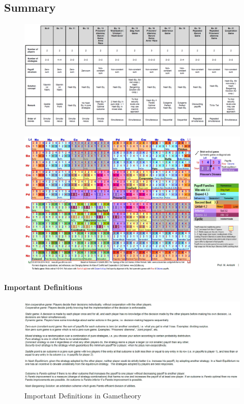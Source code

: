 \subsection{Summary}

\begin{figure}[H]
    \centering
    \includegraphics[width=\textwidth]{Pictures/Game_Theory_summary.png}
\end{figure}

\begin{figure}[H]
    \centering
    \includegraphics[width=\textwidth]{Pictures/Game_Theory_summary_2.png}
\end{figure}


\paragraph{Important Definitions}


\begin{figure}[H]
    \centering
    \includegraphics[width=\textwidth]{Pictures/Game_Theory_important_definitions.png}
    \caption{Important Definitions in Gametheory}
\end{figure}


